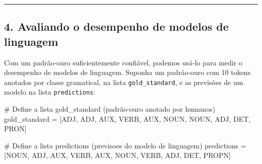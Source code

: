 \documentclass[
  brazilian,
  11pt,
]{article}
\newenvironment{Shaded}{\begin{snugshade}}{\end{snugshade}}
\newcommand{\CommentTok}[1]{\textcolor[rgb]{0.48,0.49,0.49}{#1}}
\newcommand{\NormalTok}[1]{\textcolor[rgb]{0.81,0.81,0.76}{#1}}
\newcommand{\OperatorTok}[1]{\textcolor[rgb]{0.81,0.81,0.76}{#1}}
\newcommand{\StringTok}[1]{\textcolor[rgb]{0.96,0.31,0.31}{#1}}
\let\oldtexttt\texttt
\renewcommand{\texttt}[1]{{\color{inlink}\oldtexttt{#1}}}
\begin{document}
\begin{center}\rule{0.5\linewidth}{0.5pt}\end{center}

\subsection{4. Avaliando o desempenho de modelos de
linguagem}\label{avaliando-o-desempenho-de-modelos-de-linguagem}

Com um padrão‑ouro suficientemente confiável, podemos usá‑lo para medir
o desempenho de modelos de linguagem. Suponha um padrão‑ouro com 10
tokens anotados por classe gramatical, na lista \texttt{gold\_standard},
e as previsões de um modelo na lista \texttt{predictions}:

\begin{Shaded}
\begin{Highlighting}[]
\CommentTok{\# Define a lista \textquotesingle{}gold\_standard\textquotesingle{} (padrão{-}ouro anotado por humanos)}
\NormalTok{gold\_standard }\OperatorTok{=}\NormalTok{ [}\StringTok{\textquotesingle{}ADJ\textquotesingle{}}\NormalTok{, }\StringTok{\textquotesingle{}ADJ\textquotesingle{}}\NormalTok{, }\StringTok{\textquotesingle{}AUX\textquotesingle{}}\NormalTok{, }\StringTok{\textquotesingle{}VERB\textquotesingle{}}\NormalTok{, }\StringTok{\textquotesingle{}AUX\textquotesingle{}}\NormalTok{, }\StringTok{\textquotesingle{}NOUN\textquotesingle{}}\NormalTok{, }\StringTok{\textquotesingle{}NOUN\textquotesingle{}}\NormalTok{, }\StringTok{\textquotesingle{}ADJ\textquotesingle{}}\NormalTok{, }\StringTok{\textquotesingle{}DET\textquotesingle{}}\NormalTok{, }\StringTok{\textquotesingle{}PRON\textquotesingle{}}\NormalTok{]}

\CommentTok{\# Define a lista \textquotesingle{}predictions\textquotesingle{} (previsoes do modelo de linguagem)}
\NormalTok{predictions }\OperatorTok{=}\NormalTok{ [}\StringTok{\textquotesingle{}NOUN\textquotesingle{}}\NormalTok{, }\StringTok{\textquotesingle{}ADJ\textquotesingle{}}\NormalTok{, }\StringTok{\textquotesingle{}AUX\textquotesingle{}}\NormalTok{, }\StringTok{\textquotesingle{}VERB\textquotesingle{}}\NormalTok{, }\StringTok{\textquotesingle{}AUX\textquotesingle{}}\NormalTok{, }\StringTok{\textquotesingle{}NOUN\textquotesingle{}}\NormalTok{, }\StringTok{\textquotesingle{}VERB\textquotesingle{}}\NormalTok{, }\StringTok{\textquotesingle{}ADJ\textquotesingle{}}\NormalTok{, }\StringTok{\textquotesingle{}DET\textquotesingle{}}\NormalTok{, }\StringTok{\textquotesingle{}PROPN\textquotesingle{}}\NormalTok{]}
\end{Highlighting}
\end{Shaded}
\end{document}
